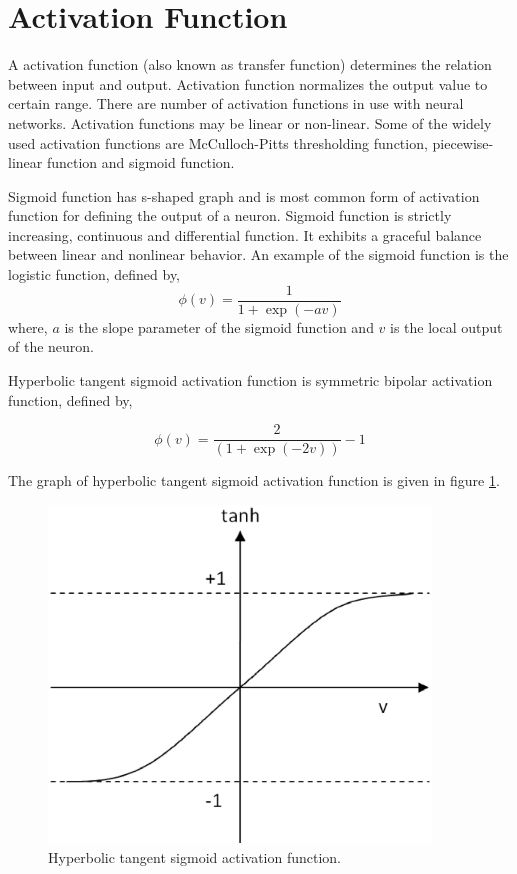 \section{Activation Function}
\label{appendix_activation_functions}
A activation function (also known as transfer function) determines the relation between input and output. Activation function normalizes the output value to certain range. There are number of activation functions in use with neural networks. Activation functions may be linear or non-linear. Some of the widely used activation functions are McCulloch-Pitts thresholding function, piecewise-linear function and sigmoid function.

Sigmoid function has s-shaped graph and is most common form of activation function for defining the output of a neuron. Sigmoid function is strictly increasing, continuous and differential function. It exhibits a graceful balance between linear and nonlinear behavior. An example of the sigmoid function is the logistic function, defined by,
\begin{equation}
\phi(v)=\frac{1}{1+\exp(-av)}
\end{equation}
where, $a$ is the slope parameter of the sigmoid function and $v$ is the local output of the neuron.

Hyperbolic tangent sigmoid activation function is symmetric bipolar activation function, defined by,

\begin{equation}
\phi(v)=\frac{2}{(1+\exp(-2v))}-1
\end{equation}

The graph of hyperbolic tangent sigmoid activation function is given in figure \ref{figure_tanh_activation_function}.
\begin{figure}[h]
\centering
\includegraphics[width=4in]{figures/ann/tanh.eps}
\caption{Hyperbolic tangent sigmoid activation function.}
\label{figure_tanh_activation_function}
\end{figure}